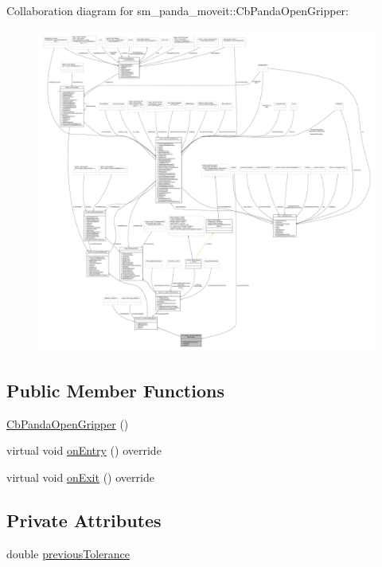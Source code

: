 Collaboration diagram for sm\+\_\+panda\+\_\+moveit\+:\+:Cb\+Panda\+Open\+Gripper\+:
\nopagebreak
\begin{figure}[H]
\begin{center}
\leavevmode
\includegraphics[width=350pt]{classsm__panda__moveit_1_1CbPandaOpenGripper__coll__graph}
\end{center}
\end{figure}
\subsection*{Public Member Functions}
\begin{DoxyCompactItemize}
\item 
\hyperlink{classsm__panda__moveit_1_1CbPandaOpenGripper_af5adc14214e1283b15684577dae136f1}{Cb\+Panda\+Open\+Gripper} ()
\item 
virtual void \hyperlink{classsm__panda__moveit_1_1CbPandaOpenGripper_ace4c87d312e8343fcf392f43956f954f}{on\+Entry} () override
\item 
virtual void \hyperlink{classsm__panda__moveit_1_1CbPandaOpenGripper_a40378849466821989b11f0561945f8fe}{on\+Exit} () override
\end{DoxyCompactItemize}
\subsection*{Private Attributes}
\begin{DoxyCompactItemize}
\item 
double \hyperlink{classsm__panda__moveit_1_1CbPandaOpenGripper_add6c758e01a2c484debb3ccf48e4597d}{previous\+Tolerance}
\end{DoxyCompactItemize}
